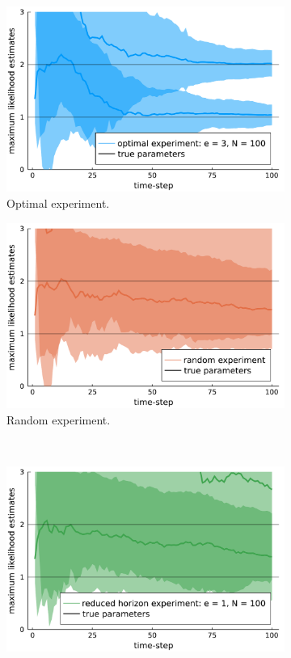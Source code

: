 \begin{figure}[H]
	\begin{subfigure}[b]{0.45\textwidth}
		\includegraphics[width=1.0\textwidth]{figure/paper 3/ensemble online estimate optimal}
		\caption{Optimal experiment.}
		\label{figEnsembleOpt}
	\end{subfigure}
	\begin{subfigure}[b]{0.45\textwidth}
		\centering
		\includegraphics[width=1.0\textwidth]{figure/paper 3/ensemble online estimate random}
		\caption{Random experiment.}
		\label{figEnsembleRand}
	\end{subfigure}\\
	\begin{subfigure}[b]{0.45\textwidth}
		\includegraphics[width=1.0\textwidth]{figure/paper 3/ensemble online estimate reduced adaptivity}

\end{subfigure}
\end{figure}
